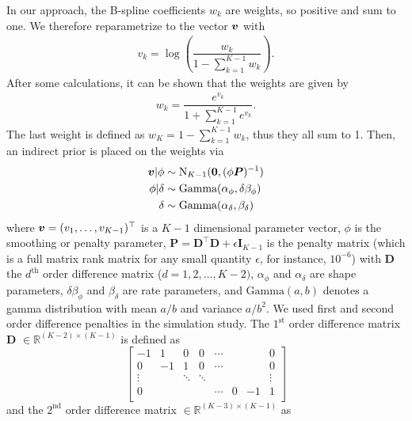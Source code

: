 \documentclass[twocolumn,final]{svjour3}
\newcommand{\bm}[1]{\mbox{\boldmath $#1$}}
\begin{document}
In our approach, the B-spline coefficients $w_k$ are weights, so positive and sum to one. 
We therefore reparametrize to the vector $\bm{v}$ with
\begin{align*}
v_k = \log \left( \dfrac{w_k}{1-\sum_{k=1}^{K-1}w_k} \right).
\end{align*}
After some calculations, it can be shown that the weights are given by
\begin{align*}
w_k = \dfrac{e^{v_k}}{1+ \sum^{K-1}_{k=1}e^{v_k}}.
\end{align*}
The last weight is defined as $w_K = 1 - \sum_{k=1}^{K-1}w_k$, thus they all sum to 1.
Then, an indirect prior is placed on the weights via
\begin{align*}
\bm{v}|\phi&\sim\text{N}_{K-1}(\bm{0}, (\phi \bm{P})^{-1})\\
\phi|\delta &\sim \text{Gamma}(\alpha_{\phi}, \delta \beta_{\phi})\\
\delta &\sim \text{Gamma}(\alpha_{\delta}, \beta_{\delta})
\end{align*}
where $\bm{v} = (v_1,\dots,v_{K-1})^\top$ is a $K-1$ dimensional parameter vector, $\phi$ is the smoothing or penalty parameter, $\textbf{P} = \textbf{D}^\top \textbf{D} +\epsilon \textbf{I}_{K-1}$ is the penalty matrix (which is a full matrix rank matrix for any small quantity $\epsilon$, for instance, $10^{-6}$) with $\textbf{D}$ the $d^{\text{th}}$ order difference matrix ($d=1,2,\ldots, K-2)$, $\alpha_{\phi}$ and $\alpha_{\delta}$ are shape parameters, $\delta \beta_{\phi}$ and $\beta_{\delta}$ are rate parameters, and $\text{Gamma}(a,b)$ denotes a gamma distribution with mean $a/b$ and variance $a/b^2$.
We used first and second order difference penalties in the simulation study.
The $1^{\text{st}}$ order difference matrix \textbf{D} $\in \mathbb{R}^{(K-2)\times (K-1)}$  is defined as
\begin{equation}\label{eq:D1}
\begin{bmatrix}
-1 & 1   & 0  & 0 & \cdots & & & 0 \\
0  &  -1 & 1  & 0 & \cdots & & & 0 \\
\vdots  &    & \ddots & \ddots   & &&& \vdots \\   
0 &    &    &   & \cdots & 0 &  -1 & 1 \\
\end{bmatrix}
\end{equation}
and the $2^{\text{nd}}$ order difference matrix $\in \mathbb{R}^{(K-3)\times (K-1)} $ as
\end{document}
